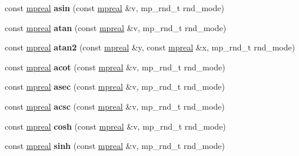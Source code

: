 \begin{DoxyCompactItemize}
const \hyperlink{classmpfr_1_1mpreal}{mpreal} {\bfseries asin} (const \hyperlink{classmpfr_1_1mpreal}{mpreal} \&v, mp\+\_\+rnd\+\_\+t rnd\+\_\+mode)
\item 
\mbox{\label{classmpfr_1_1mpreal_aa19f76d7fd1eae4ddc314b9d1ab17464}} 
const \hyperlink{classmpfr_1_1mpreal}{mpreal} {\bfseries atan} (const \hyperlink{classmpfr_1_1mpreal}{mpreal} \&v, mp\+\_\+rnd\+\_\+t rnd\+\_\+mode)
\item 
\mbox{\label{classmpfr_1_1mpreal_ae6f1717d9047172d51dfbb9853cd6a7d}} 
const \hyperlink{classmpfr_1_1mpreal}{mpreal} {\bfseries atan2} (const \hyperlink{classmpfr_1_1mpreal}{mpreal} \&y, const \hyperlink{classmpfr_1_1mpreal}{mpreal} \&x, mp\+\_\+rnd\+\_\+t rnd\+\_\+mode)
\item 
\mbox{\label{classmpfr_1_1mpreal_ac4b46680524ff3879463eb04b9e7fca5}} 
const \hyperlink{classmpfr_1_1mpreal}{mpreal} {\bfseries acot} (const \hyperlink{classmpfr_1_1mpreal}{mpreal} \&v, mp\+\_\+rnd\+\_\+t rnd\+\_\+mode)
\item 
\mbox{\label{classmpfr_1_1mpreal_aba2976900b2546858712af62fa790702}} 
const \hyperlink{classmpfr_1_1mpreal}{mpreal} {\bfseries asec} (const \hyperlink{classmpfr_1_1mpreal}{mpreal} \&v, mp\+\_\+rnd\+\_\+t rnd\+\_\+mode)
\item 
\mbox{\label{classmpfr_1_1mpreal_a486c93b3543ede21a815c03b5252a54a}} 
const \hyperlink{classmpfr_1_1mpreal}{mpreal} {\bfseries acsc} (const \hyperlink{classmpfr_1_1mpreal}{mpreal} \&v, mp\+\_\+rnd\+\_\+t rnd\+\_\+mode)
\item 
\mbox{\label{classmpfr_1_1mpreal_ab0972af5491259488d9f28b1535b1905}} 
const \hyperlink{classmpfr_1_1mpreal}{mpreal} {\bfseries cosh} (const \hyperlink{classmpfr_1_1mpreal}{mpreal} \&v, mp\+\_\+rnd\+\_\+t rnd\+\_\+mode)
\item 
\mbox{\label{classmpfr_1_1mpreal_ab1f9acbf83a2d15d29459782c6566698}} 
const \hyperlink{classmpfr_1_1mpreal}{mpreal} {\bfseries sinh} (const \hyperlink{classmpfr_1_1mpreal}{mpreal} \&v, mp\+\_\+rnd\+\_\+t rnd\+\_\+mode)
\item 
\mbox{\label{classmpfr_1_1mpreal_a886687a61699954de2f8de1a9dafdca4}} 

\end{DoxyCompactItemize}
